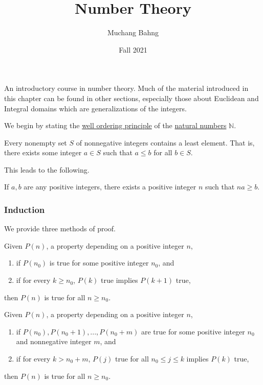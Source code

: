 \documentclass{article}
\newcounter{theorem}[section]
\begin{document}
\title{Number Theory}
\author{Muchang Bahng}
\date{Fall 2021}

\maketitle
\tableofcontents
\pagebreak

An introductory course in number theory. Much of the material introduced in this chapter can be found in other sections, especially those about Euclidean and Integral domains which are generalizations of the integers. 

We begin by stating the \hyperref[st-thm:well-ordering-principle]{well ordering principle} of the \hyperref[st-def:naturals]{natural numbers} $\mathbb{N}$. 

\begin{theorem}
  \label{thm:well-ordering-principle}
Every nonempty set $S$ of nonnegative integers contains a least element. That is, there exists some integer $a \in S$ such that $a \leq b$ for all $b \in S$. 
\end{theorem}

This leads to the following. 

\begin{theorem}
  \label{thm:archimedean-property}
If $a, b$ are any positive integers, there exists a positive integer $n$ such that $n a \geq b$. 
\end{theorem}

\subsubsection{Induction}
We provide three methods of proof. 

\begin{theorem}
  \label{thm:induction-principle}
Given $P(n)$, a property depending on a positive integer $n$, 
\begin{enumerate}
    \item if $P(n_0)$ is true for some positive integer $n_0$, and 
    \item if for every $k \geq n_0$, $P(k)$ true implies $P(k+1)$ true, 
\end{enumerate}
then $P(n)$ is true for all $n \geq n_0$. 
\end{theorem}

\begin{theorem}
  \label{thm:strong-induction-principle}
Given $P(n)$, a property depending on a positive integer $n$, 
\begin{enumerate}
    \item if $P(n_0), P(n_0 + 1), ..., P(n_0 +m)$ are true for some positive integer $n_0$ and nonnegative integer $m$, and
    \item if for every $k > n_0 + m$, $P(j)$ true for all $n_0 \leq j \leq k$ implies $P(k)$ true, 
\end{enumerate}
then $P(n)$ is true for all $n \geq n_0$. 
\end{theorem}
\end{document}
